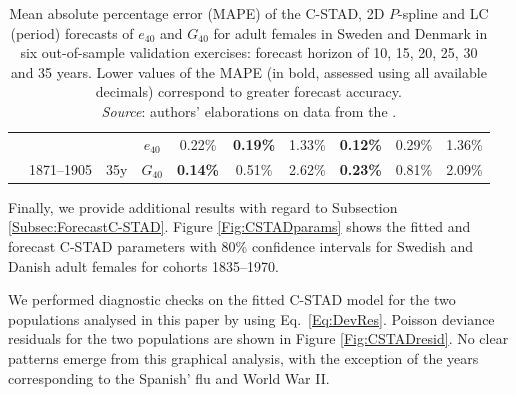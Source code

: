 \documentclass[11pt, a4paper]{article}
\begin{document}
\begin{table}[h!]
\begin{tabular}{ccccccc|ccc}
		\hhline{|----------|}
		\rowcolor{my-grey} 
		\multicolumn{1}{c}{\cellcolor{my-grey}}   &   
		\multicolumn{1}{c}{\cellcolor{my-grey}}   &  \multicolumn{1}{c}{\cellcolor{my-grey}}                & \multicolumn{1}{c|}{\cellcolor{my-grey}$e_{40}$} & 0.22\% &  \textbf{0.19\%} & 1.33\% & \textbf{0.12\%} &  0.29\% & 1.36\%  \\
		\rowcolor{my-grey}           
		\multicolumn{1}{c}{\multirow{-2}{*}{\cellcolor{my-grey}1835--1870}}           &
		\multicolumn{1}{c}{\multirow{-2}{*}{\cellcolor{my-grey}1871--1905}}               &
		\multicolumn{1}{c}{\multirow{-2}{*}{\cellcolor{my-grey}35y}}               & \multicolumn{1}{c|}{\cellcolor{my-grey}$G_{40}$} & \textbf{0.14\%} &   0.51\% & 2.62\% & \textbf{0.23\%} &  0.81\% & 2.09\%   \\		
		
		\bottomrule 
		
	\end{tabular}
	\caption{Mean absolute percentage error (MAPE) of the C-STAD, 2D $P$-spline and LC (period) forecasts of $e_{40}$ and $G_{40}$ for adult females in Sweden and Denmark in six out-of-sample validation exercises: forecast horizon of 10, 15, 20, 25, 30 and 35 years. Lower values of the MAPE (in bold, assessed using all available decimals) correspond to greater forecast accuracy.\\ \small \textit{Source}: authors' elaborations on data from the \cite{HMD}. }\label{Table:MAPE}
\end{table}

Finally, we provide additional results with regard to Subsection \ref{Subsec:ForecastC-STAD}. Figure \ref{Fig:CSTADparams} shows the fitted and forecast C-STAD parameters with 80\% confidence intervals for Swedish and Danish adult females for cohorts 1835--1970.

We performed diagnostic checks on the fitted C-STAD model for the two populations analysed in this paper by using Eq.~\eqref{Eq:DevRes}. Poisson deviance residuals for the two populations are shown in Figure \ref{Fig:CSTADresid}. No clear patterns emerge from this graphical analysis, with the exception of the years corresponding to the Spanish' flu and World War II.
\end{document}
